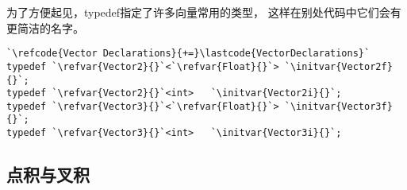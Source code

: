 为了方便起见，{\ttfamily typedef}指定了许多向量常用的类型，
这样在别处代码中它们会有更简洁的名字。
\begin{lstlisting}
`\refcode{Vector Declarations}{+=}\lastcode{VectorDeclarations}`
typedef `\refvar{Vector2}{}`<`\refvar{Float}{}`> `\initvar{Vector2f}{}`;
typedef `\refvar{Vector2}{}`<int>   `\initvar{Vector2i}{}`;
typedef `\refvar{Vector3}{}`<`\refvar{Float}{}`> `\initvar{Vector3f}{}`;
typedef `\refvar{Vector3}{}`<int>   `\initvar{Vector3i}{}`;
\end{lstlisting}

\subsection{点积与叉积}\label{sub:点积与叉积}